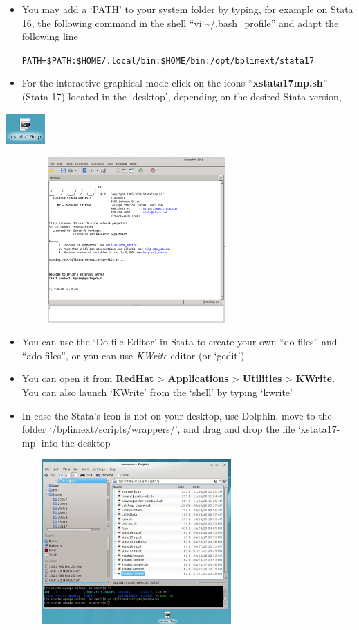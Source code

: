 \documentclass[
  11pt,
  a4paper,
]{article}
\begin{document}
\begin{itemize}
\item
  You may add a `PATH' to your system folder by typing, for example on
  Stata 16, the following command in the shell ``vi
  \textasciitilde/.bash\_profile'' and adapt the following line

  \texttt{PATH=\$PATH:\$HOME/.local/bin:\$HOME/bin:/opt/bplimext/stata17}
\item
  For the interactive graphical mode click on the icons
  ``\textbf{xstata17mp.sh}'' (Stata 17) located in the `desktop',
  depending on the desired Stata version,
\end{itemize}

\includegraphics[width=0.59055in,height=0.46654in]{./media/image11.png}

\includegraphics[width=3.93701in,height=2.48638in]{./media/image12.png}

\begin{itemize}
\item
  You can use the `Do-file Editor' in Stata to create your own
  ``do-files'' and ``ado-files'', or you can use \emph{KWrite} editor
  (or `gedit')
\item
  You can open it from \textbf{RedHat} \textgreater{}
  \textbf{Applications} \textgreater{} \textbf{Utilities} \textgreater{}
  \textbf{KWrite}. You can also launch `KWrite' from the `shell' by
  typing `kwrite'
\item
  In case the Stata's icon is not on your desktop, use Dolphin, move to
  the folder `/bplimext/scripts/wrappers/', and drag and drop the file
  `xstata17-mp' into the desktop
\end{itemize}

\includegraphics[width=3.93701in,height=2.48638in]{./media/image12b.png}
\end{document}
